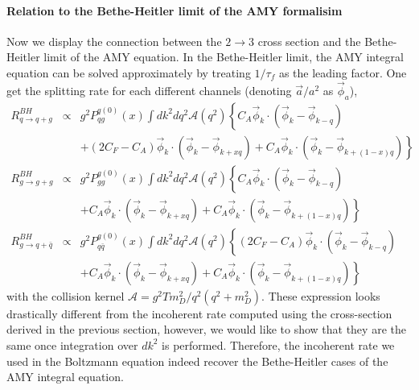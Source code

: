 \paragraph*{Relation to the Bethe-Heitler limit of the AMY formalisim}
Now we display the connection between the $2\rightarrow 3$ cross section and the Bethe-Heitler limit of the AMY equation.
In the Bethe-Heitler limit, the AMY integral equation can be solved approximately by treating $1/\tau_f$ as the leading factor. 
One get the splitting rate for each different channels (denoting $\vec{a}/a^2$ as $\vec{\phi}_{a}$), 
\begin{eqnarray}
R_{q\rightarrow q+g}^{BH} &\propto& g^2 P_{qg}^{q(0)}(x) \int d k^2 d q^2 \mathcal{A}(q^2) \left\{
C_A\vec{\phi}_k\cdot\left(\vec{\phi}_k-\vec{\phi}_{k-q}\right) \right.\\\nonumber
&&+\left. (2C_F-C_A) \vec{\phi}_k\cdot\left(\vec{\phi}_k-\vec{\phi}_{k+xq}\right)
+ C_A \vec{\phi}_k\cdot\left(\vec{\phi}_k - \vec{\phi}_{k+(1-x)q}\right)
\right\}
\\
R_{g\rightarrow g+g}^{BH} &\propto& g^2 P_{gg}^{g(0)}(x) \int d k^2 d q^2 \mathcal{A}(q^2) \left\{
C_A\vec{\phi}_k\cdot\left(\vec{\phi}_k-\vec{\phi}_{k-q}\right) \right.\\\nonumber
&&+\left. C_A \vec{\phi}_k\cdot\left(\vec{\phi}_k-\vec{\phi}_{k+xq}\right)
+ C_A \vec{\phi}_k\cdot\left(\vec{\phi}_k - \vec{\phi}_{k+(1-x)q}\right)
\right\}
\\
R_{g\rightarrow q+\bar{q}}^{BH} &\propto& g^2 P_{q\bar{q}}^{g(0)}(x) \int d k^2  d q^2 \mathcal{A}(q^2) \left\{
(2C_F-C_A)\vec{\phi}_k\cdot\left(\vec{\phi}_k-\vec{\phi}_{k-q}\right) \right.\\\nonumber
&&+\left. C_A \vec{\phi}_k\cdot\left(\vec{\phi}_k-\vec{\phi}_{k+xq}\right)
+ C_A \vec{\phi}_k\cdot\left(\vec{\phi}_k - \vec{\phi}_{k+(1-x)q}\right)
\right\}
\end{eqnarray}
with the collision kernel $\mathcal{A} = g^2 T m_D^2/q^2(q^2+m_D^2)$. These expression looks drastically different from the incoherent rate computed using the cross-section derived in the previous section, however, we would like to show that they are the same once integration over $dk^2$ is performed.
Therefore, the incoherent rate we used in the Boltzmann equation indeed recover the Bethe-Heitler cases of the AMY integral equation.


